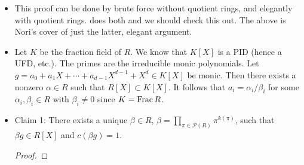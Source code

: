 \documentclass[../notes.tex]{subfiles}
\begin{document}
\begin{itemize}
\begin{proof}
        For our purposes, it will suffice to prove the case where $c(f)=c(g)=1$. This is because our ultimate purpose in proving this lemma is to show that a polynomial in $R[X]$ that is not irreducible is reducible specifically in $R[X]$, i.e., we need not resort to higher container rings such as $\Frac R$ in which we could reduce $p\in R[X]$. Let's begin.\par
        Let $\pi\in R$ be irreducible (hence prime). Consider the canonical surjection $R\to R/(\pi)$. It gives rise to a ring homomorphism $\varphi:R[X]\to R/(\pi)[X]$ defined by
        \begin{equation*}
            \varphi(a_0+a_1X+\cdots+a_dX^d) = \bar{a}_0+\bar{a}_1X+\cdots+\bar{a}_dX^d
        \end{equation*}
        In words, the ring homomorphism takes any input polynomial and reduces all of its coefficients modulo $p$. Moving on, $c(f)=1$ implies that there exists $i$ such that $\bar{a}_i\neq 0$ (if $c(f)=\pi$, for instance, then all $\bar{a}_i=0$). Therefore, $\varphi(f)\neq 0$. Similarly, $c(g)=1$ implies that $\varphi(g)\neq 0$. It follows since $R/(\pi)$ is an integral domain and thus contains no zero divisors that $\varphi(fg)=\varphi(f)\varphi(g)\neq 0$. Consequently, $\pi\nmid c(fg)$ (again, if $\pi\mid c(fg)$, then all coefficients would be divisible by $\pi$, hence would be equivalent to 0 mod $\pi$, hence $\varphi(fg)$ would equal 0). Clearly, this argument holds for any $\pi\in R$ irreducible. Thus, since $c(fg)$ is not divisible by any element of $R$, we must have that $c(fg)=1$.
    \end{proof}
    \item This proof can be done by brute force without quotient rings, and elegantly with quotient rings. \textcite{bib:DummitFoote} does both and we should check this out. The above is Nori's cover of just the latter, elegant argument.
    \item Let $K$ be the fraction field of $R$. We know that $K[X]$ is a PID (hence a UFD, etc.). The primes are the irreducible monic polynomials. Let $g=a_0+a_1X+\cdots+a_{d-1}X^{d-1}+X^d\in K[X]$ be monic. Then there exists a nonzero $\alpha\in R$ such that $R[X]\subset K[X]$. It follows that $a_i=\alpha_i/\beta_i$ for some $\alpha_i,\beta_i\in R$ with $\beta_i\neq 0$ since $K=\operatorname{Frac} R$.
    \item Claim 1: There exists a unique $\beta\in R$, $\beta=\prod_{\pi\in\mathcal{P}(R)}\pi^{k(\pi)}$, such that $\beta g\in R[X]$ and $c(\beta g)=1$.
    \begin{proof}

\end{proof}
\end{itemize}
\end{document}
